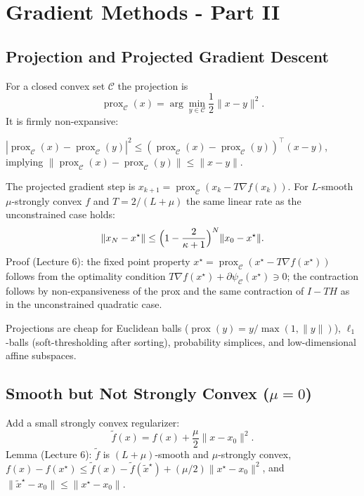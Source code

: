 
\section{Gradient Methods - Part II}

\subsection{Projection and Projected Gradient Descent}
For a closed convex set $\mathcal{C}$ the projection is
\[
  \operatorname{prox}_{\mathcal{C}}(x)=\arg\min_{y\in\mathcal{C}}\frac12\|x-y\|^2.
\]
It is firmly non-expansive:
\begin{lemma}
  $|\operatorname{prox}_{\mathcal{C}}(x)-\operatorname{prox}_{\mathcal{C}}(y)|^2\le(\operatorname{prox}_{\mathcal{C}}(x)-\operatorname{prox}_{\mathcal{C}}(y))^\top(x-y)$,
  implying
  $\|\operatorname{prox}_{\mathcal{C}}(x)-\operatorname{prox}_{\mathcal{C}}(y)\|\le\|x-y\|$.
\end{lemma}

The projected gradient step is
$x_{k+1}=\operatorname{prox}_{\mathcal{C}}(x_k-T\nabla f(x_k))$. For
$L$-smooth $\mu$-strongly convex $f$ and $T=2/(L+\mu)$ the same
linear rate as the unconstrained case holds:
\[
  \|x_N-x^\star\|\le\Bigl(1-\frac{2}{\kappa+1}\Bigr)^N\|x_0-x^\star\|.
\]
Proof (Lecture 6): the fixed point property
$x^\star=\operatorname{prox}_{\mathcal{C}}(x^\star-T\nabla
f(x^\star))$ follows from the optimality condition $T\nabla
f(x^\star)+\partial\psi_{\mathcal{C}}(x^\star)\ni0$; the contraction
follows by non-expansiveness of the prox and the same contraction of
$I-TH$ as in the unconstrained quadratic case.

Projections are cheap for Euclidean balls
($\operatorname{prox}(y)=y/\max(1,\|y\|)$), $\ell_1$-balls
(soft-thresholding after sorting), probability simplices, and
low-dimensional affine subspaces.

\subsection{Smooth but Not Strongly Convex ($\mu=0$)}
Add a small strongly convex regularizer:
\[
  \tilde{f}(x)=f(x)+\frac{\mu}{2}\|x-x_0\|^2.
\]
Lemma (Lecture 6): $\tilde{f}$ is $(L+\mu)$-smooth and $\mu$-strongly
convex,
$f(x)-f(x^\star)\le\tilde{f}(x)-\tilde{f}(\tilde{x}^\star)+(\mu/2)\|x^\star-x_0\|^2$,
and $\|\tilde{x}^\star-x_0\|\le\|x^\star-x_0\|$.

